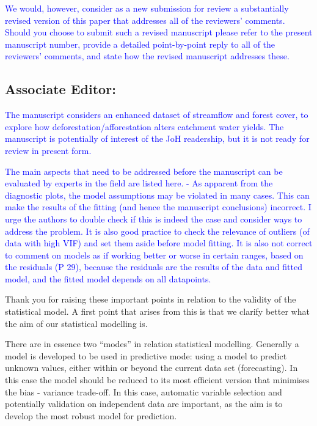 \documentclass[]{elsarticle} %
\begin{document}
\textcolor{blue}{We would, however, consider as a new submission for review a substantially revised version of this paper that addresses all of the reviewers' comments.  Should you choose to submit such a revised manuscript please refer to the present manuscript number, provide a detailed point-by-point reply to all of the reviewers' comments, and state how the revised manuscript addresses these.}

\hypertarget{associate-editor}{%
\subsection{Associate Editor:}\label{associate-editor}}

\textcolor{blue}{The manuscript considers an enhanced dataset of streamflow and forest cover, to explore how deforestation/afforestation alters catchment water yields. The manuscript is potentially of interest of the JoH readership, but it is not ready for review in present form.}

\textcolor{blue}{The main aspects that need to be addressed before the manuscript can be evaluated by experts in the field are listed here. 
- As apparent from the diagnostic plots, the model assumptions may be violated in many cases. This can make the results of the fitting (and hence the manuscript conclusions) incorrect. I urge the authors to double check if this is indeed the case and consider ways to address the problem. It is also good practice to check the relevance of outliers (of data with high VIF) and set them aside before model fitting. It is also not correct to comment on models as if working better or worse in certain ranges, based on the residuals (P 29), because the residuals are the results of the data and fitted model, and the fitted model depends on all datapoints.}

Thank you for raising these important points in relation to the validity of the statistical model.
A first point that arises from this is that we clarify better what the aim of our statistical modelling is.

There are in essence two ``modes'' in relation statistical modelling. Generally a model is developed to be used in predictive mode: using a model to predict unknown values, either within or beyond the current data set (forecasting). In this case the model should be reduced to its most efficient version that minimises the bias - variance trade-off. In this case, automatic variable selection and potentially validation on independent data are important, as the aim is to develop the most robust model for prediction.
\end{document}
